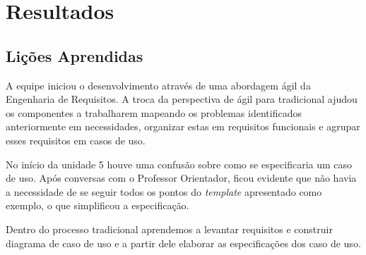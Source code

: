 \documentclass[
	12pt,				%
	oneside,			%
	a4paper,			%
	english,			%
	brazil,				%
	]{abntex2}
\begin{document}
\part{Resultados}
%
%
\chapter{Lições Aprendidas}
A equipe iniciou o desenvolvimento através de uma abordagem ágil da Engenharia de Requisitos. A troca da perspectiva de ágil para tradicional ajudou os componentes a trabalharem mapeando os problemas identificados anteriormente em necessidades, organizar estas em requisitos funcionais e agrupar esses requisitos em casos de uso.

No início da unidade 5 houve uma confusão sobre como se especificaria um caso de uso. Após conversas com o Professor Orientador, ficou evidente que não havia a necessidade de se seguir todos os pontos do \textit{template} apresentado como exemplo, o que simplificou a especificação.

Dentro do processo tradicional  aprendemos a levantar requisitos e construir diagrama de caso de uso e a partir dele elaborar as especificações dos caso de uso.



% 


\end{document}
